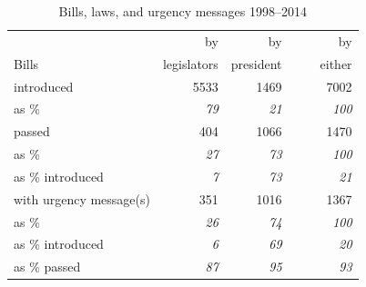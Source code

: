 \documentclass[letter,12pt]{article}
\begin{document}
\begin{table}
\begin{center}
\begin{tabular}{lrrr}
                         &  by           &  by          &    by      \\
Bills                    &  legislators  &  president   &    ~~~~either  \\ \hline
introduced               &         5533  &        1469  &      7002  \\
as \%                    &    \emph{79}  &   \emph{21}  & \emph{100} \\ \hdashline
passed                   &          404  &        1066  &      1470  \\
as \%                    &    \emph{27}  &   \emph{73}  & \emph{100} \\
as \% introduced         &     \emph{7}  &   \emph{73}  &  \emph{21} \\ \hdashline
with urgency message(s)  &          351  &        1016  &      1367  \\
as \%                    &    \emph{26}  &   \emph{74}  & \emph{100} \\
as \% introduced         &     \emph{6}  &   \emph{69}  &  \emph{20} \\
as \% passed             &    \emph{87}  &   \emph{95}  &  \emph{93} \\ \hline
\end{tabular}
\caption{Bills, laws, and urgency messages 1998--2014}\label{T:billDescriptives}
\end{center}
\end{table}
\end{document}
